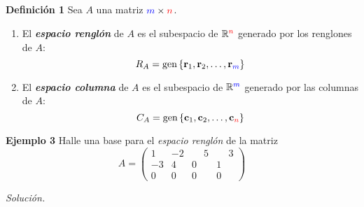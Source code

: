 
\subsection{}

{\nologo
\begin{frame}%

\begin{defi}{\textbf{Definición 1}}
	Sea $A$ una matriz ${\color{blue}m}\times {\color{red}n}$.
	\begin{enumerate}
		\item[\labelname{$a$}] El \textbf{\textit{espacio renglón}} de $A$ es el subespacio de $\mathbb{R}^{\color{red}n}$ generado por los renglones de $A$:
		\[
		R_A = \text{gen}\, \{ \mathbf{r}_1, \mathbf{r}_2, \hdots,\mathbf{r}_{\color{blue}m} \}
		\]
		\item[\labelname{$b$}] El \textbf{\textit{espacio columna}} de $A$ es el subespacio de $\mathbb{R}^{\color{blue}m}$ generado por las columnas de $A$:
		\[
		C_A = \text{gen}\, \{ \mathbf{c}_1, \mathbf{c}_2, \hdots,\mathbf{c}_{\color{red}n} \}
		\]
	\end{enumerate}
\end{defi}	


\begin{ej}{\textbf{Ejemplo  3}}
	Halle una base para el \textit{espacio renglón} de la matriz
	\[
	A = 
	\left( 
	\begin{array}{rrrr}	
	1 & -2 & \phantom{-}5 & \phantom{-}3 \\ 
	-3 & 4 & 0 & 1 \\
	0 & 0 & 0 & 0
	\end{array} 
	\right)
	\]
\end{ej}
\textit{Solución.}

\end{frame}
}


\subsection{}

